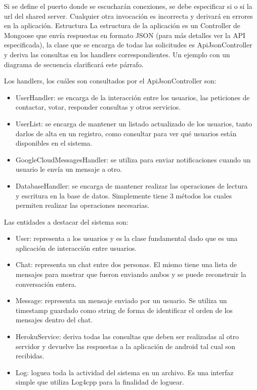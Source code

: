 \documentclass[a4paper,10pt,spanish]{sphinxmanual}
\begin{document}
Si se define el puerto donde se escucharán conexiones, se debe especificar si o si la url del shared server. Cualquier otra invocación es incorrecta y derivará en errores en la aplicación.
Estructura
La estructura de la aplicación es un Controller de Mongoose que envía respuestas en formato JSON (para más detalles ver la API especificada), la clase que se encarga de todas las solicitudes es ApiJsonController y deriva las consultas en los handlers correspondientes. Un ejemplo con un diagrama de secuencia clarificará este párrafo.

\noindent{}

Los handlers, los cuáles son consultados por el ApiJsonController son:
\begin{itemize}
\item {} 
UserHandler: se encarga de la interacción entre los usuarios, las peticiones de contactar, votar, responder consultas y otros servicios.

\item {} 
UserList: se encarga de mantener un listado actualizado de los usuarios, tanto darlos de alta en un registro, como consultar para ver qué usuarios están disponibles en el sistema.

\item {} 
GoogleCloudMessagesHandler: se utiliza para enviar notificaciones cuando un usuario le envía un mensaje a otro.

\item {} 
DatabaseHandler: se encarga de mantener realizar las operaciones de lectura y escritura en la base de datos. Simplemente tiene 3 métodos los cuales permiten realizar las operaciones necesarias.

\end{itemize}

Las entidades a destacar del sistema son:
\begin{itemize}
\item {} 
User: representa a los usuarios y es la clase fundamental dado que es una aplicación de interacción entre usuarios.

\item {} 
Chat: representa un chat entre dos personas. El mismo tiene una lista de mensajes para mostrar que fueron enviando ambos y se puede reconstruir la conversación entera.

\item {} 
Message: representa un mensaje enviado por un usuario. Se utiliza un timestamp guardado como string de forma de identificar el orden de los mensajes dentro del chat.

\item {} 
HerokuService: deriva todas las consultas que deben ser realizadas al otro servidor y devuelve las respuestas a la aplicación de android tal cual son recibidas.

\item {} 
Log: loguea toda la actividad del sistema en un archivo. Es una interfaz simple que utiliza Log4cpp para la finalidad de loguear.

\end{itemize}
\end{document}
